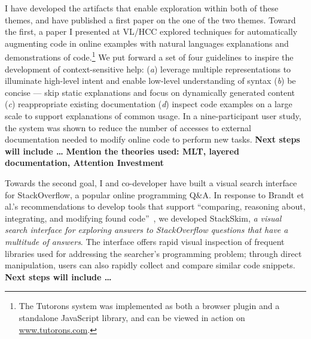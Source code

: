 \documentclass[12pt]{memoir}
\begin{document}
I have developed the artifacts that enable exploration within both of these themes, and have published a first paper on the one of the two themes.
Toward the first, a paper I presented at VL/HCC explored techniques for automatically augmenting code in online examples with natural languages explanations and demonstrations of code.\footnote{%
The Tutorons system was implemented as both a browser plugin and a standalone JavaScript library, and can be viewed in action on \url{www.tutorons.com}.
}
We put forward a set of four guidelines to inspire the development of context-sensitive help:
(\emph{a}) leverage multiple representations to illuminate high-level intent and enable low-level understanding of syntax
(\emph{b}) be concise --- skip static explanations and focus on dynamically generated content
(\emph{c}) reappropriate existing documentation
(\emph{d}) inspect code examples on a large scale to support explanations of common usage.
In a nine-participant user study, the system was shown to reduce the number of accesses to external documentation needed to modify online code to perform new tasks.
\textbf{Next steps will include \ldots}
\textbf{Mention the theories used: MLT, layered documentation, Attention Investment}

Towards the second goal, I and co-developer have built a visual search interface for StackOverflow, a popular online programming Q\&A.
In response to Brandt et al.'s recommendations to develop tools that support ``comparing, reasoning about, integrating, and modifying found code''~\cite{brandt_opportunistic_2008}, we developed StackSkim, \emph{a visual search interface for exploring answers to StackOverflow questions that have a multitude of answers}.
The interface offers rapid visual inspection of frequent libraries used for addressing the searcher's programming problem;
through direct manipulation, users can also rapidly collect and compare similar code snippets.
\textbf{Next steps will include \ldots}
\end{document}
